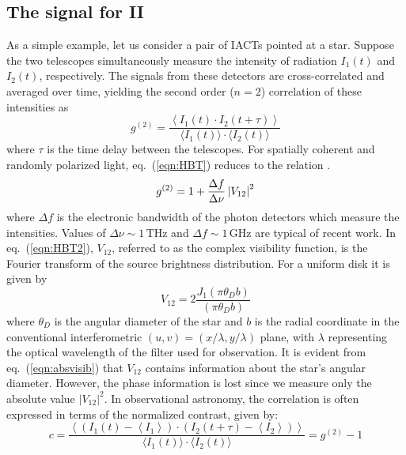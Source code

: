 \subsection{The signal for II}\label{sec:signal}
As a simple example, let us consider a pair of IACTs pointed at a star. Suppose the two telescopes simultaneously measure the intensity of radiation $I_1(t)$ and $I_2(t)$, respectively. The signals from these detectors are cross-correlated and averaged over time, yielding the second order ($n=2$) correlation of these intensities as \citep[cf.][]{acciari2020optical, 2013APh....43..331D}
\begin{equation}
	g^{(2)}= \frac{\left\langle I_1(t) \cdot I_2(t + \tau) \right\rangle}{\langle I_1(t) \rangle \cdot \langle I_2(t) \rangle} 
	\label{eqn:HBT}
\end{equation}
where $\tau$ is the time delay between the telescopes. For spatially coherent and randomly polarized light, eq.~(\ref{eqn:HBT}) reduces to the relation \citep[sometimes called the Siegert relation, see e.g.,][]{acciari2020optical}.
\begin{equation}
	g^{(2)} = 1 + \frac{\Delta f}{\Delta \nu} \abs{V_{12}}^2
	\label{eqn:HBT2}
\end{equation}
where $\Delta f$ is the electronic bandwidth of the photon detectors which measure the intensities.  Values of $\Delta\nu\sim 1\,\mathrm{THz}$ and $\Delta f \sim 1\,\mathrm{GHz}$ are typical of recent work.  In eq.~(\ref{eqn:HBT2}), $V_{12}$, referred to as the complex visibility function, is the Fourier transform of the source brightness distribution. For a uniform disk it is given by
\begin{equation}
 V_{12} = 2 \frac{J_1(\pi\theta_D b)}{(\pi\theta_D b)}
\label{eqn:absvisib}
\end{equation}
where $\theta_D$ is the angular diameter of the star and $b$ is the radial coordinate in the conventional interferometric $(u , v) = (x/\lambda, y/\lambda)$ plane, with $\lambda$ representing the optical wavelength of the filter used for observation. It is evident from eq.~(\ref{eqn:absvisib}) that $V_{12}$ contains information about the star's angular diameter. However, the phase information is lost since we measure only the absolute value $\vert V_{12} \vert^2$. In observational astronomy, the correlation is often expressed in terms of the normalized contrast, given by:
\begin{equation}
	c = \frac{\left\langle \left( I_1(t) - \left\langle I_1 \right\rangle \right) \cdot \left( I_2(t + \tau) - \left\langle I_2 \right\rangle \right) \right\rangle}{\langle I_1(t) \rangle \cdot \langle I_2(t) \rangle} = g^{(2)} - 1
\end{equation}
